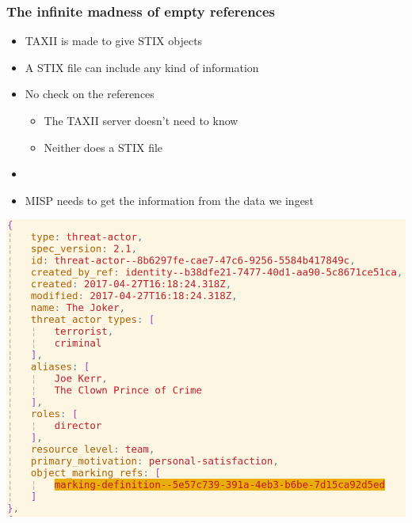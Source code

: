 \begin{frame}
\begin{minipage}{0.3\textwidth}
    \end{minipage}
\end{frame}

\begin{frame}
    \frametitle{The infinite madness of empty references}
    \begin{minipage}{0.5\textwidth}
        \begin{itemize}
            \item TAXII is made to give STIX objects
            \item A STIX file can include any kind of information
            \item No check on the references
            \begin{itemize}
                \item The TAXII server doesn't need to know
                \item Neither does a STIX file
            \end{itemize}
            \item []
            \item MISP needs to get the information from the data we ingest
        \end{itemize}
    \end{minipage}%
    \begin{minipage}{0.5\textwidth}
        \includegraphics[scale=0.25]{images/missing_reference.png}
    \end{minipage}
\end{frame}

